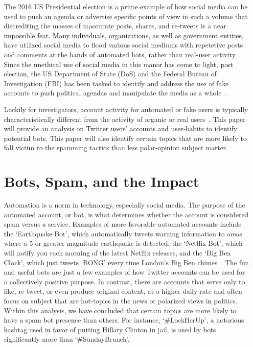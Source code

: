 The 2016 US Presidential election is a prime example of how social media can be
used to push an agenda or advertise specific points of view in such a volume
that discrediting the masses of inaccurate posts, shares, and re-tweets is a
near impossible feat. Many individuals, organizations, as well as government
entities, have utilized social media to flood various social mediums with
repetetive posts and comments at the hands of automated bots, rather than
real-user activity~\cite{WPostTwitterBots}. Since the unethical use of social
media in this manor has come to light, post election, the US Department of
State (DoS) and the Federal Bureau of Investigation (FBI) has been tasked to
identify and address the use of fake accounts to push political agendas and
manipulate the media as a whole~\cite{FBISocialMediaInvestigation}.

Luckily for investigators, account activity for automated or fake users is
typically characteristically different from the activity of organic or real
users~\cite{BDSTwitterBots}. This paper will provide an analysis on Twitter
users' accounts and user-habits to identify potential bots. This paper will
also identify certain topics that are more likely to fall victim to the
spamming tactics than less polar-opinion subject matter.

\section{Bots, Spam, and the Impact}

Automation is a norm in technology, especially social media. The purpose of the
automated account, or bot, is what determines whether the account is considered
spam versus a service. Examples of more favorable automated accounts include
the `Earthquake Bot', which automatically tweets warning information to areas
where a 5 or greater magnitude earthquake is detected, the `Netflix Bot', which
will notify you each morning of the latest Netflix releases, and the `Big Ben
Clock', which just tweets `BONG' every time London's Big Ben
chimes~\cite{cooltwitterbots}. The fun and useful bots are just a few examples
of how Twitter accounts can be used for a collectively positive purpose. In
contrast, there are accounts that serve only to like, re-tweet, or even produce
original content, at a higher daily rate and often focus on subject that are
hot-topics in the news or polarized views in politics. Within this analysis, we
have concluded that certain topics are more likely to have a spam bot presence
than others. For instance, `\#LockHerUp', a notorious hashtag used in favor of
putting Hillary Clinton in jail, is used by bots significantly more than
`\#SundayBrunch'.

